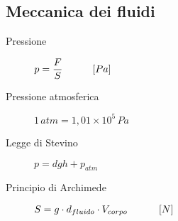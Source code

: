 \documentclass[a4paper,11pt,italian]{article}
\begin{document}
\subsection{Meccanica dei fluidi}

\begin{description}
  \item[Pressione] 
$ p = \dfrac{F}{S} \hspace*{3em} [Pa]$
  
  \item[Pressione atmosferica]
  $ 1 \, atm = 1,01 \times 10^5 \, Pa $
  
  
  \item[Legge di Stevino]
  $ p = dgh + p_{atm} $
  
  \item[Principio di Archimede] 
  $ S = g \cdot d_{fluido} \cdot V_{corpo} \hspace*{3em} \left[ N \right] $
  
  


\end{description}
\end{document}
